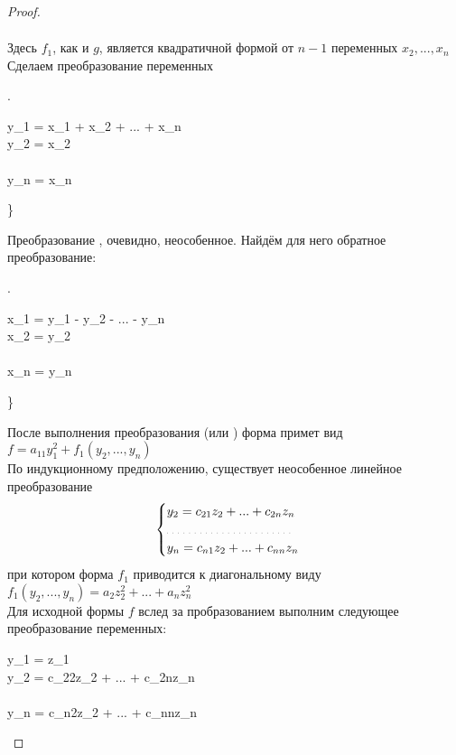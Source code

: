 \begin{proof}
\begin{itemize}
\begin{itemize}
\begin{multline*}
			\end{multline*}
			Здесь $ f_1 $, как и $ g $, является квадратичной формой от $ n - 1 $ переменных $ x_2, ..., x_n $ \\
			Сделаем преобразование переменных
			\begin{equ}{11}
				\left.
				\begin{aligned}
					y_1 = x_1 + x_2 + ... + x_n \\
					y_2 = x_2 \\
					\widedots[5em] \\
					y_n = x_n
				\end{aligned} \right\}
			\end{equ}
			Преобразование , очевидно, неособенное. Найдём для него обратное преобразование:
			\begin{equ}{12}
				\left.
				\begin{aligned}
					x_1 = y_1 - y_2 - ... - \frac{a_{1n}}{a_{11}}y_n \\
					x_2 = y_2 \\
					\widedots[5em] \\
					x_n = y_n
				\end{aligned} \right\}
			\end{equ}
			После выполнения преобразования  (или ) форма примет вид $ f = a_{11}y_1^2 + f_1(y_2, ..., y_n) $ \\
			По индукционному предположению, существует неособенное линейное преобразование
			$$
			\begin{cases}
				y_2 = c_{21}z_2 + ... + c_{2n}z_n \\
				\widedots[10em] \\
				y_n = c_{n1}z_2 + ... + c_{nn}z_n
			\end{cases} $$
			при котором форма $ f_1 $ приводится к диагональному виду $ f_1(y_2, ..., y_n) = a_2z_2^2 + ... + a_nz_n^2 $ \\
			Для исходной формы $ f $ вслед за пробразованием  выполним следующее преобразование переменных:
			\begin{equ}{13}
				\begin{rcases}
					y_1 = z_1 \\
					y_2 = c_{22}z_2 + ... + c_{2n}z_n \\
					\widedots \\
					y_n = c_{n2}z_2 + ... + c_{nn}z_n
				\end{rcases}
			\end{equ}

\end{itemize}
\end{itemize}
\end{proof}
